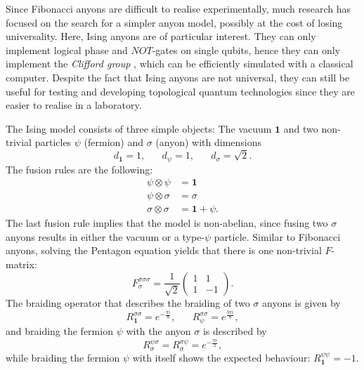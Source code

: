 \begin{exmp}
\end{exmp}

\begin{exmp}
	\label{ex:Ising}
	Since Fibonacci anyons are difficult to realise experimentally, much research has focused on the search for a simpler anyon model, possibly at the cost of losing universality. Here, Ising anyons are of particular interest. They can only implement logical phase and $NOT$-gates on single qubits, hence they can only implement the \emph{Clifford group} \cite{Ahlbrecht2009}, which can be efficiently simulated with a classical computer. Despite the fact that Ising anyons are not universal, they can still be useful for testing and developing topological quantum technologies since they are easier to realise in a laboratory.
	
	The Ising model consists of three simple objects: The vacuum $\mathbf{1}$ and two non-trivial particles $\psi$ (fermion) and $\sigma$ (anyon) with dimensions
		\begin{equation}
			d_\mathbf{1}=1,\hspace{20pt}d_\psi=1,\hspace{20pt}d_\sigma=\sqrt{2}.
		\end{equation}
	The fusion rules are the following:
		\begin{align}
			\psi\otimes\psi&=\mathbf{1}\\
			\psi\otimes\sigma&=\sigma\\
			\sigma\otimes\sigma&=\mathbf{1}+\psi.
		\end{align}
	The last fusion rule implies that the model is non-abelian, since fusing two $\sigma$ anyons results in either the vacuum or a type-$\psi$ particle. Similar to Fibonacci anyons, solving the Pentagon equation yields that there is one non-trivial $F$-matrix:
		\begin{equation}
			F_\sigma^{\sigma\sigma\sigma}=\frac{1}{\sqrt{2}}\begin{pmatrix}
				1 & 1 \\
				1 & -1
			\end{pmatrix}.
		\end{equation}
	The braiding operator that describes the braiding of two $\sigma$ anyons is given by
		\begin{equation}
			R_\mathbf{1}^{\sigma\sigma}=e^{-\frac{\pi i}{8}},\hspace{20pt}R_\psi^{\sigma\sigma}=e^\frac{3\pi i}{8},
		\end{equation}
	and braiding the fermion $\psi$ with the anyon $\sigma$ is described by 
		\begin{equation}
			R_\sigma^{\psi\sigma}=R_\sigma^{\sigma\psi}=e^{-\frac{\pi i}{2}},
		\end{equation}
	while braiding the fermion $\psi$ with itself shows the expected behaviour: $R_\mathbf{1}^{\psi\psi}=-1$.
\end{exmp}


